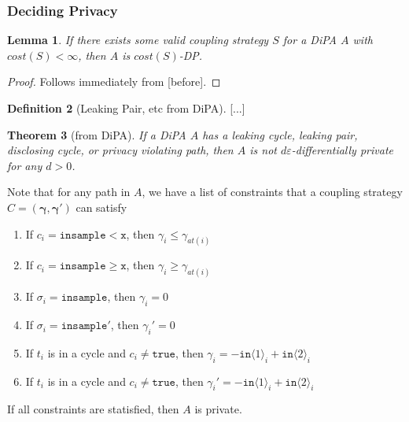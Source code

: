 \documentclass[12pt]{article}
\newcommand{\gguard}[1][x]{\texttt{insample}\geq #1}
\newcommand{\lguard}[1][x]{\texttt{insample} < #1}
\newcommand{\brangle}[1]{\langle #1 \rangle}
\newtheorem{thm}{Theorem}[section]
\newtheorem{lemma}[thm]{Lemma}
\theoremstyle{definition}
\newtheorem{defn}[thm]{Definition}
\begin{document}
\subsubsection{Deciding Privacy}


\begin{lemma}
    If there exists some valid coupling strategy $S$ for a DiPA $A$ with $cost(S)<\infty$, then $A$ is $cost(S)$-DP.
\end{lemma}
\begin{proof}
    Follows immediately from [before].
\end{proof}

\begin{defn}[Leaking Pair, etc from DiPA]
    [...]
\end{defn}

\begin{thm}[from DiPA]\label{DiPACounterexamplesThm}
    If a DiPA $A$ has a leaking cycle, leaking pair, disclosing cycle, or privacy violating path, then $A$ is not $d\varepsilon$-differentially private for any $d>0$. 
\end{thm}

Note that for any path in $A$, we have a list of constraints that a coupling strategy $C=(\mathbf{\gamma}, \mathbf{\gamma}')$ can satisfy\begin{enumerate}
    \item If $c_i = \lguard[\texttt{x}]$, then $\gamma_i\leq\gamma_{at(i)}$
    \item If $c_i = \gguard[\texttt{x}]$, then $\gamma_i\geq\gamma_{at(i)}$
    \item If $\sigma_i = \texttt{insample}$, then $\gamma_i=0$
    \item If $\sigma_i = \texttt{insample}'$, then $\gamma_i'=0$
    \item If $t_i$ is in a cycle and $c_i\neq \texttt{true}$, then $\gamma_i = -\texttt{in}\brangle{1}_i+\texttt{in}\brangle{2}_i$
    \item If $t_i$ is in a cycle and $c_i\neq \texttt{true}$, then $\gamma_i' = -\texttt{in}\brangle{1}_i+\texttt{in}\brangle{2}_i$
\end{enumerate}


If all constraints are statisfied, then $A$ is private. 
\end{document}
